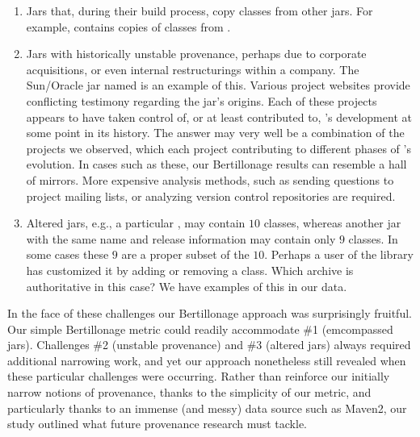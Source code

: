 \begin{enumerate}

\item Jars that, during their build process, copy classes from other jars.
    For example,  contains copies of classes from
    .

\item Jars with historically unstable provenance, perhaps due to corporate
    acquisitions, or even internal restructurings within a company.  The
    Sun/Oracle jar named  is an example of this.  Various
    project websites provide conflicting testimony regarding the jar's
    origins.
    Each of these projects appears to have taken control of, or at least
    contributed to, 's development at some point in its
    history.  The answer may very well be a combination of the projects we
    observed, which each project contributing to different phases of
    's evolution.  In cases such as these, our
    Bertillonage results can resemble a hall of mirrors.  More expensive
    analysis methods, such as sending questions to project mailing lists,
    or analyzing version control repositories are required.

\item Altered jars, e.g., a particular , may contain
    $10$ classes, whereas another jar with the same name and release
    information may contain only $9$ classes.  In some cases these $9$ are
    a proper subset of the $10$.  Perhaps a user of the library has
    customized it by adding or removing a class.  Which archive is
    authoritative in this case?  We have examples of this in our data.

\end{enumerate}

In the face of these challenges our Bertillonage approach was surprisingly
fruitful.  Our simple Bertillonage metric could readily accommodate \#1
(emcompassed jars).  Challenges \#2 (unstable provenance) and \#3 (altered
jars) always required additional narrowing work, and yet our approach
nonetheless still revealed when these particular challenges were occurring.
Rather than reinforce our initially narrow notions of provenance, thanks to
the simplicity of our metric, and particularly thanks to an immense (and
messy) data source such as Maven2, our study outlined what future
provenance research must tackle.

